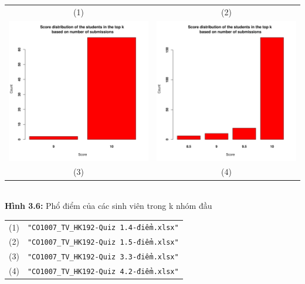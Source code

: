 \documentclass[a4paper]{article}
\theoremstyle{definition}
\begin{document}
\begin{enumerate}[a)]
\begin{itemize}
\begin{itemize}
\begin{center}
\begin{tabular}{c c}
                     (1) & (2) \\
                     \includegraphics[width = 6.9cm]{Images/img3-6-3.png} &
                     \includegraphics[width = 6.9cm]{Images/img3-6-4.png} \\
                     (3) & (4)
                \end{tabular}\\
                \textbf{Hình 3.6:} Phổ điểm của các sinh viên trong k nhóm đầu\\
                \begin{tabular}{c c}
                     (1) & \texttt{"CO1007\_TV\_HK192-Quiz 1.4-điểm.xlsx"}\\
                     (2) & \texttt{"CO1007\_TV\_HK192-Quiz 1.5-điểm.xlsx"}\\
                     (3) & \texttt{"CO1007\_TV\_HK192-Quiz 3.3-điểm.xlsx"}\\
                     (4) & \texttt{"CO1007\_TV\_HK192-Quiz 4.2-điểm.xlsx"}
                \end{tabular}
            \end{center}
        \end{itemize}
    \end{itemize}
\end{enumerate}
\end{document}
